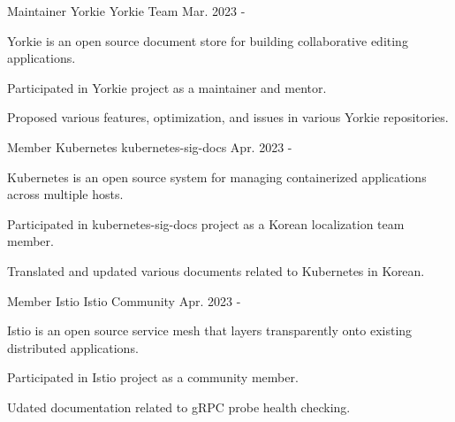 

\begin{cventries}

  \cventry
    {Maintainer} %
    {Yorkie} %
    {Yorkie Team} %
    {Mar. 2023 - } %
    {
      \begin{cvitems} %
        \item {Yorkie is an open source document store for building collaborative editing applications.}
        \item {Participated in Yorkie project as a maintainer and mentor.}
        \item {Proposed various features, optimization, and issues in various Yorkie repositories.}
      \end{cvitems}
    }

  \cventry
  {Member} %
  {Kubernetes} %
  {kubernetes-sig-docs} %
  {Apr. 2023 - } %
  {
    \begin{cvitems} %
      \item {Kubernetes is an open source system for managing containerized applications across multiple hosts.}
      \item {Participated in kubernetes-sig-docs project as a Korean localization team member.}
      \item {Translated and updated various documents related to Kubernetes in Korean.}      
    \end{cvitems}
  }

  \cventry
    {Member} %
    {Istio} %
    {Istio Community} %
    {Apr. 2023 - } %
    {
      \begin{cvitems} %
        \item {Istio is an open source service mesh that layers transparently onto existing distributed applications.}
        \item {Participated in Istio project as a community member.}
        \item {Udated documentation related to gRPC probe health checking.}
      \end{cvitems}
    }

\end{cventries}
